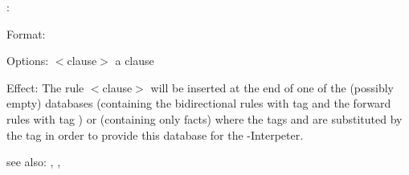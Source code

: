 \az:

Format: 

Options: $<$clause$>$ a \COLAB{} clause

Effect: The rule $<$clause$>$ will be inserted at the end of one of the (possibly 
        empty) \FORWARD{} databases  (containing the bidirectional 
	rules with tag  and the forward rules with tag ) or  
        (containing only facts) where the tags  and  are substituted
	by the tag  in order to provide this database for the 
	\RELFUN-Interpeter. 

see also: \consult, \destroy, \replace
